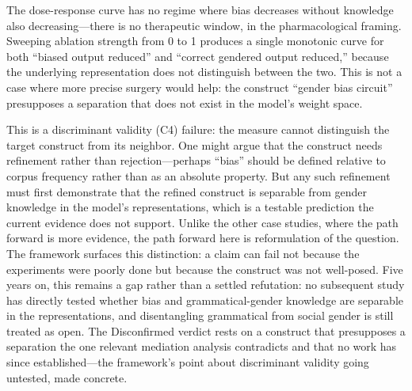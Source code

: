 \documentclass{article}
\begin{document}
The dose-response curve has no regime where bias decreases without knowledge also decreasing---there is no therapeutic window, in the pharmacological framing. Sweeping ablation strength from 0 to 1 produces a single monotonic curve for both ``biased output reduced'' and ``correct gendered output reduced,'' because the underlying representation does not distinguish between the two. This is not a case where more precise surgery would help: the construct ``gender bias circuit'' presupposes a separation that does not exist in the model's weight space.

This is a discriminant validity (C4) failure: the measure cannot distinguish the target construct from its neighbor. One might argue that the construct needs refinement rather than rejection---perhaps ``bias'' should be defined relative to corpus frequency rather than as an absolute property. But any such refinement must first demonstrate that the refined construct is separable from gender knowledge in the model's representations, which is a testable prediction the current evidence does not support. Unlike the other case studies, where the path forward is more evidence, the path forward here is reformulation of the question. The framework surfaces this distinction: a claim can fail not because the experiments were poorly done but because the construct was not well-posed. Five years on, this remains a gap rather than a settled refutation: no subsequent study has directly tested whether bias and grammatical-gender knowledge are separable in the representations, and disentangling grammatical from social gender is still treated as open. The Disconfirmed verdict rests on a construct that presupposes a separation the one relevant mediation analysis contradicts and that no work has since established---the framework's point about discriminant validity going untested, made concrete.
\end{document}
